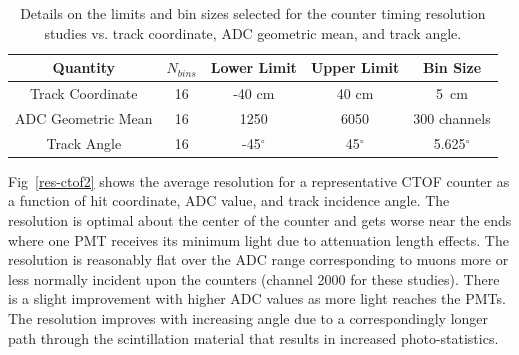 \documentclass{elsart}
\begin{document}
\begin{table}[htpb]
\begin{center}
\begin{tabular} {|c|c|c|c|c|} \hline
Quantity           & $N_{bins}$ & Lower Limit & Upper Limit & Bin Size \\ \hline
Track Coordinate   & 16 & -40 cm      & 40 cm      & 5~cm \\ \hline
ADC Geometric Mean & 16 & 1250        & 6050       & 300 channels \\ \hline
Track Angle        & 16 & -45$^\circ$ & 45$^\circ$ & 5.625$^\circ$ \\ \hline
\end{tabular}
\end{center}
\caption{Details on the limits and bin sizes selected for the counter timing resolution studies vs.
track coordinate, ADC geometric mean, and track angle.}
\label{res-studies}
\end{table}

Fig~\ref{res-ctof2} shows the average resolution for a representative CTOF counter as a function
of hit coordinate, ADC value, and track incidence angle. The resolution is optimal about the center of
the counter and gets worse near the ends where one PMT receives its minimum light due to attenuation
length effects. The resolution is reasonably flat over the ADC range corresponding to muons more or
less normally incident upon the counters (channel 2000 for these studies). There is a slight improvement
with higher ADC values as more light reaches the PMTs. The resolution improves with increasing angle
due to a correspondingly longer path through the scintillation material that results in increased
photo-statistics.
\end{document}
